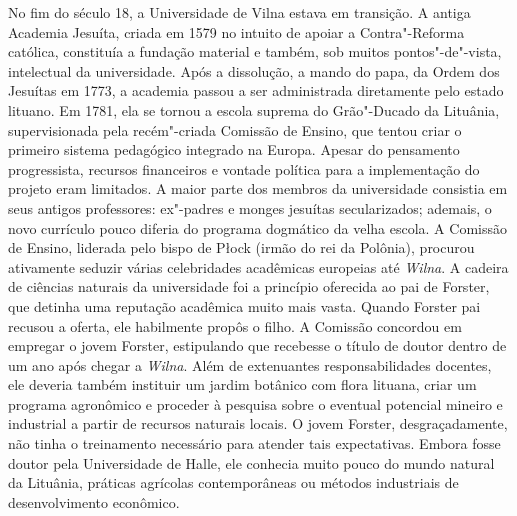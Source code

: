 \asterisc

%

No fim do século 18, a Universidade de Vilna estava em transição. A
antiga Academia Jesuíta, criada em 1579 no intuito de apoiar a
Contra"-Reforma católica, constituía a fundação material e também, sob
muitos pontos"-de"-vista, intelectual da universidade. Após a dissolução,
a mando do papa, da Ordem dos Jesuítas em 1773, a academia passou a ser
administrada diretamente pelo estado lituano. Em 1781, ela se tornou a
escola suprema do Grão"-Ducado da Lituânia, supervisionada pela
recém"-criada Comissão de Ensino, que tentou criar o primeiro sistema
pedagógico integrado na Europa. Apesar do pensamento progressista,
recursos financeiros e vontade política para a implementação do projeto
eram limitados. A maior parte dos membros da universidade consistia em
seus antigos professores: ex"-padres e monges jesuítas secularizados;
ademais, o novo currículo pouco diferia do programa dogmático da velha
escola. A Comissão de Ensino, liderada pelo bispo de Płock (irmão do rei
da Polônia), procurou ativamente seduzir várias celebridades acadêmicas
europeias até \textit{Wilna}. A cadeira de ciências naturais da universidade foi
a princípio oferecida ao pai de Forster, que detinha uma reputação
acadêmica muito mais vasta. Quando Forster pai recusou a oferta, ele
habilmente propôs o filho. A Comissão concordou em empregar o jovem
Forster, estipulando que recebesse o título de doutor dentro de um ano
após chegar a \textit{Wilna}. Além de extenuantes responsabilidades docentes, ele
deveria também instituir um jardim botânico com flora lituana, criar um
programa agronômico e proceder à pesquisa sobre o eventual potencial
mineiro e industrial a partir de recursos naturais locais. O jovem
Forster, desgraçadamente, não tinha o treinamento necessário para
atender tais expectativas. Embora fosse doutor pela Universidade de
Halle, ele conhecia muito pouco do mundo natural da Lituânia, práticas
agrícolas contemporâneas ou métodos industriais de desenvolvimento
econômico.

